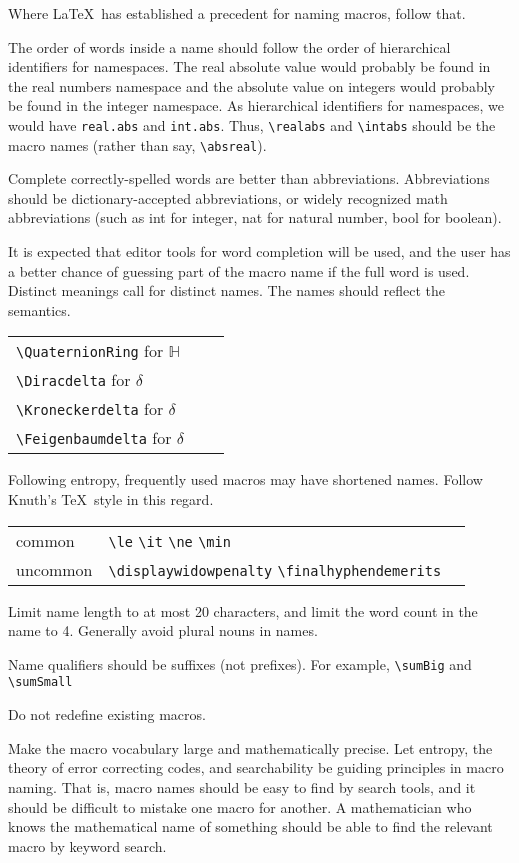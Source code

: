 \documentclass[12pt]{amsart}
\begin{document}
Where \LaTeX\ has established a precedent for naming macros, follow that.

The order of words inside a name should follow the order of hierarchical identifiers for
namespaces.  The real absolute value would probably be found in the real numbers namespace
and the absolute value on integers would probably be found in the integer namespace.
As hierarchical identifiers for namespaces, 
we would have \verb!real.abs! and \verb!int.abs!.  
Thus, \verb!\realabs! and \verb!\intabs! should be the macro names
(rather than say, \verb!\absreal!). 

Complete correctly-spelled words are better than abbreviations.  
Abbreviations should be dictionary-accepted abbreviations, or widely recognized
math abbreviations (such as int for integer, nat for natural number, bool for
boolean).  

It is expected that editor tools for
word completion will be used, and the user has a better chance of guessing
part of the macro name if the full word is used.  Distinct meanings call for
distinct names.  The names should reflect the semantics.




\begin{tabular}{l l l}
 \verb!\QuaternionRing! for ${\mathbb H}$ \\
 \verb!\Diracdelta! for $\delta$ \\
 \verb!\Kroneckerdelta! for $\delta$ \\
 \verb!\Feigenbaumdelta! for $\delta$
\end{tabular}



Following entropy, frequently
used macros may have shortened names.  Follow Knuth's \TeX\ style in this regard.
 
\begin{tabular}{ l l l }
common & \verb!\le! \verb!\it! \verb!\ne! \verb!\min! \\
uncommon & \verb!\displaywidowpenalty! \verb!\finalhyphendemerits!
\end{tabular}

Limit name length to at most 20 characters, and limit the word count in the
name to 4.  Generally avoid plural nouns in names. 


Name qualifiers should be suffixes (not prefixes). For example,
\verb!\sumBig! and \verb!\sumSmall!

Do not redefine existing macros.

Make the macro vocabulary large and mathematically precise.
Let entropy, the theory of error correcting codes, and searchability 
be guiding principles in macro naming. 
That is, macro names should be easy to find by search tools, and it
should be difficult to mistake one macro for another.  A mathematician
who knows the mathematical name of something should be able to
find the relevant macro by keyword search.
\end{document}
